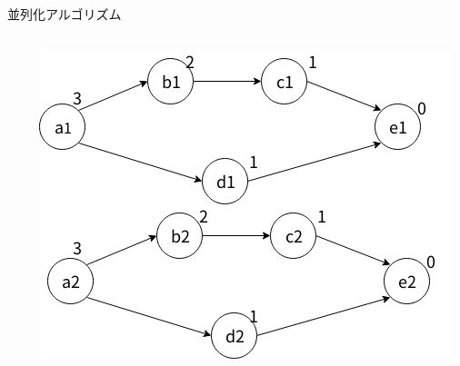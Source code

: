 \documentclass[dvipdfmx,final,t,10pt]{beamer}
\begin{document}
\begin{frame}[fragile]
\begin{block}{並列化アルゴリズム}
\begin{columns}
\begin{column}{0.665\textwidth}
                \vskip-0.3cm
            \end{column}
            \begin{column}{0.3\textwidth}
                \begin{center}
                    \vskip-0.8cm
                    \includegraphics[scale=0.4]{image/lifegame.png}
                \end{center}
            \end{column}
        \end{columns}
    \end{block}


\end{frame}
\end{document}
